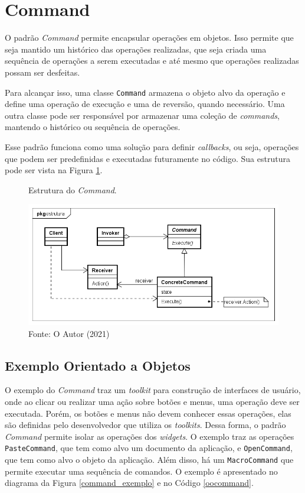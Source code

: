 \section{Command}

O padrão \textit{Command} permite encapsular operações 
em objetos. Isso permite que seja mantido um 
histórico das operações realizadas, que seja 
criada uma sequência de operações a serem 
executadas e até mesmo que operações realizadas 
possam ser desfeitas.\cite{gamma:1995}

Para alcançar isso, uma classe \texttt{Command} armazena o 
objeto alvo da operação e define uma operação 
de execução e uma de reversão, quando necessário. 
Uma outra classe pode ser responsável por armazenar 
uma coleção de \textit{commands}, mantendo o 
histórico ou sequência de operações. 

Esse padrão funciona como uma solução para definir 
\textit{callbacks}, ou seja, operações que podem ser 
predefinidas e executadas futuramente no código. Sua 
estrutura pode ser vista na Figura \ref{command_struct}.

\begin{figure}[htb]
	\caption{\label{command_struct}Estrutura do \textit{Command}.}
	\begin{center}
	    \includegraphics[scale=0.5]{5_padroes-contexto-funcional/5.3_comportamentais/5.3.02_command/command_struct.png}
	\end{center}
  \caption*{Fonte: O Autor (2021)}
\end{figure}

\subsection*{Exemplo Orientado a Objetos}

O exemplo do \textit{Command} traz um \textit{toolkit} para 
construção de interfaces de usuário, onde ao clicar 
ou realizar uma ação sobre botões e menus, uma 
operação deve ser executada. Porém, os botões e 
menus não devem conhecer essas operações, elas são 
definidas pelo desenvolvedor que utiliza os \textit{toolkits}. 
Dessa forma, o padrão \textit{Command} permite isolar as 
operações dos \textit{widgets}. O exemplo traz as 
operações \texttt{PasteCommand}, que tem como alvo um 
documento da aplicação, e \texttt{OpenCommand}, que tem como 
alvo o objeto da aplicação. Além disso, há um 
\texttt{MacroCommand} que permite executar uma sequência 
de comandos. O exemplo é apresentado no diagrama da 
Figura \ref{command_exemplo} e no Código \ref{oocommand}.

